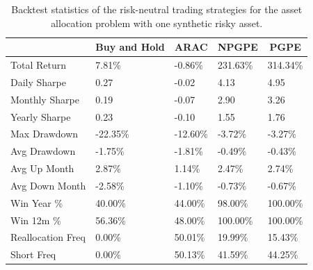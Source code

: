\begin{table}[t!]
\centering
\begin{tabular}{@{}lllll@{}}
\toprule
 & \multicolumn{1}{c}{Buy and Hold} & \multicolumn{1}{c}{ARAC} & \multicolumn{1}{c}{NPGPE} & \multicolumn{1}{c}{PGPE} \\ \midrule
Total Return & 7.81\% & -0.86\% & 231.63\% & 314.34\% \\
Daily Sharpe & 0.27 & -0.02 & 4.13 & 4.95 \\
Monthly Sharpe & 0.19 & -0.07 & 2.90 & 3.26 \\
Yearly Sharpe & 0.23 & -0.10 & 1.55 & 1.76 \\
Max Drawdown & -22.35\% & -12.60\% & -3.72\% & -3.27\% \\
Avg Drawdown & -1.75\% & -1.81\% & -0.49\% & -0.43\% \\
Avg Up Month & 2.87\% & 1.14\% & 2.47\% & 2.74\% \\
Avg Down Month & -2.58\% & -1.10\% & -0.73\% & -0.67\% \\
Win Year \% & 40.00\% & 44.00\% & 98.00\% & 100.00\% \\
Win 12m \% & 56.36\% & 48.00\% & 100.00\% & 100.00\% \\
Reallocation Freq & 0.00\% & 50.01\% & 19.99\% & 15.43\% \\
Short Freq & 0.00\% & 50.13\% & 41.59\% & 44.25\% \\ \bottomrule
\end{tabular}
\caption[Backtest statistics for risk-neutral learning with one synthetic risky asset]{Backtest statistics of the risk-neutral trading strategies for the asset allocation problem with one synthetic risky asset.}
\label{tab:single_synthetic_neutral_performance}
\end{table}

